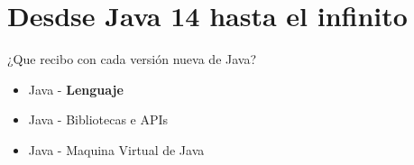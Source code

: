 \documentclass[aspectratio=169]{beamer}
\begin{document}
{
    \section{Desdse Java 14 hasta el infinito}
}


\begin{frame}[fragile]{¿Que recibo con cada versión nueva de Java?}
	\begin{itemize}
		\item Java - \textbf{Lenguaje}
		\item Java - Bibliotecas e APIs
		\item Java - Maquina Virtual de Java
	\end{itemize}
\end{frame}
\end{document}

